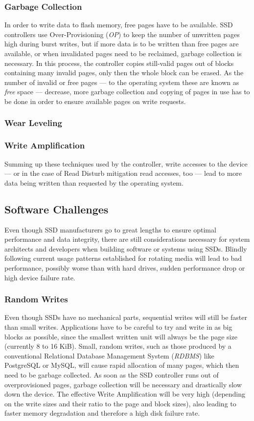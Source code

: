 \documentclass{acm_proc_article-sp}
\begin{document}
\subsubsection*{Garbage Collection}
In order to write data to flash memory, free pages have to be available. SSD controllers use Over-Provisioning (\emph{OP}) to keep the number of unwritten pages high during burst writes, but if more data is to be written than free pages are available, or when invalidated pages need to be reclaimed, garbage collection is necessary. In this process, the controller copies still-valid pages out of blocks containing many invalid pages, only then the whole block can be erased. As the number of invalid or free pages --- to the operating system these are known as \emph{free} space --- decrease, more garbage collection and copying of pages in use has to be done in order to ensure available pages on write requests.

\subsubsection*{Wear Leveling}


\subsubsection*{Write Amplification}
Summing up these techniques used by the controller, write accesses to the device --- or in the case of Read Disturb mitigation read accesses, too --- lead to more data being written than requested by the operating system. %

\subsection{Software Challenges}
Even though SSD manufacturers go to great lengths to ensure optimal performance and data integrity, there are still considerations necessary for system architects and developers when building software or systems using SSDs. Blindly following current usage patterns established for rotating media will lead to bad performance, possibly worse than with hard drives, sudden performance drop or high device failure rate.

\subsubsection*{Random Writes}
Even though SSDs have no mechanical parts, sequential writes will still be faster than small writes. Applications have to be careful to try and write in as big blocks as possible, since the smallest written unit will always be the page size (currently 8 to 16 KiB). Small, random writes, such as those produced by a conventional Relational Database Management System (\emph{RDBMS}) like PostgreSQL or MySQL, will cause rapid allocation of many pages, which then need to be garbage collected. As soon as the SSD controller runs out of overprovisioned pages, garbage collection will be necessary and drastically slow down the device. The effective Write Amplification will be very high (depending on the write sizes and their ratio to the page and block sizes), also leading to faster memory degradation and therefore a high disk failure rate.
\end{document}
